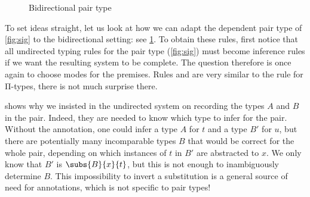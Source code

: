 \begin{figure}
    

  \caption{Bidirectional pair type}
  \label{fig:bidir-pair}
\end{figure}

To set ideas straight, let us look at how we can adapt the dependent pair type of
\cref{fig:sig} to the bidirectional setting: see \cref{fig:bidir-pair}.
To obtain these rules, first notice that all undirected typing rules for the
pair type (\cref{fig:sig})
must become inference rules if we want the resulting system to be complete.
The question therefore is once again to choose modes for the premises.
Rules  and  are
very similar to the rule for Π-types, there is not much surprise there.

 shows why we insisted in the undirected system
on recording the types $A$ and $B$ in the pair. Indeed, they are needed to
know which type to infer for the pair. Without the annotation, one could infer a
type $A$ for $t$ and a type $B'$ for $u$, but there are potentially many incomparable types $B$ that would be correct for the whole pair, depending on which instances of $t$ in $B'$ are abstracted to $x$. We only know that $B'$ is $\subs{B}{x}{t}$,
but this is not enough to inambiguously determine $B$.
This impossibility to invert a substitution is a general source of need
for annotations, which is not specific to pair types!

